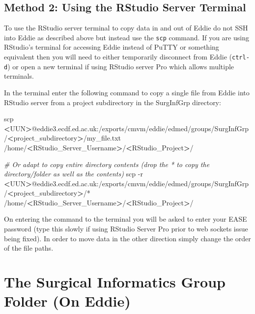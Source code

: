 \documentclass[]{book}
\newenvironment{Shaded}{\begin{snugshade}}{\end{snugshade}}
\newcommand{\CommentTok}[1]{\textcolor[rgb]{0.56,0.35,0.01}{\textit{#1}}}
\newcommand{\FunctionTok}[1]{\textcolor[rgb]{0.00,0.00,0.00}{#1}}
\newcommand{\NormalTok}[1]{#1}
\newcommand{\OperatorTok}[1]{\textcolor[rgb]{0.81,0.36,0.00}{\textbf{#1}}}
\theoremstyle{definition}
\theoremstyle{definition}
\theoremstyle{definition}
\theoremstyle{remark}
\begin{document}
\hypertarget{method-2-using-the-rstudio-server-terminal}{%
\subsection{Method 2: Using the RStudio Server
Terminal}\label{method-2-using-the-rstudio-server-terminal}}

To use the RStudio server terminal to copy data in and out of Eddie do
not SSH into Eddie as described above but instead use the \texttt{scp}
command. If you are using RStudio's terminal for accessing Eddie instead
of PuTTY or something equivalent then you will need to either
temporarily disconnect from Eddie (\texttt{ctrl-d}) or open a new
terminal if using RStudio server Pro which allows multiple terminals.

In the terminal enter the following command to copy a single file from
Eddie into RStudio server from a project subdirectory in the SurgInfGrp
directory:

\begin{Shaded}
\begin{Highlighting}[]
\FunctionTok{scp} \OperatorTok{<}\NormalTok{UUN}\OperatorTok{>}\NormalTok{@eddie3.ecdf.ed.ac.uk:/exports/cmvm/eddie/edmed/groups/SurgInfGrp/}\OperatorTok{<}\NormalTok{project_subdirectory}\OperatorTok{>}\NormalTok{/my_file.txt /home/}\OperatorTok{<}\NormalTok{RStudio_Server_Username}\OperatorTok{>}\NormalTok{/}\OperatorTok{<}\NormalTok{RStudio_Project}\OperatorTok{>}\NormalTok{/}

\CommentTok{# Or adapt to copy entire directory contents (drop the * to copy the directory/folder as well as the contents)}
\FunctionTok{scp}\NormalTok{ -r }\OperatorTok{<}\NormalTok{UUN}\OperatorTok{>}\NormalTok{@eddie3.ecdf.ed.ac.uk:/exports/cmvm/eddie/edmed/groups/SurgInfGrp/}\OperatorTok{<}\NormalTok{project_subdirectory}\OperatorTok{>}\NormalTok{/* /home/}\OperatorTok{<}\NormalTok{RStudio_Server_Username}\OperatorTok{>}\NormalTok{/}\OperatorTok{<}\NormalTok{RStudio_Project}\OperatorTok{>}\NormalTok{/}
\end{Highlighting}
\end{Shaded}

On entering the command to the terminal you will be asked to enter your
EASE password (type this slowly if using RStudio Server Pro prior to web
sockets issue being fixed). In order to move data in the other direction
simply change the order of the file paths.

\hypertarget{the-surgical-informatics-group-folder-on-eddie}{%
\section{The Surgical Informatics Group Folder (On
Eddie)}\label{the-surgical-informatics-group-folder-on-eddie}}
\end{document}
